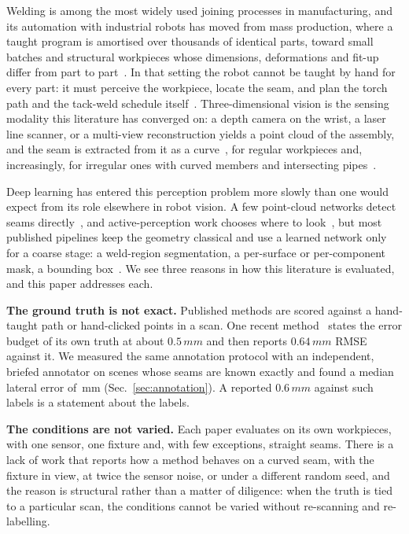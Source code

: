 \documentclass[letterpaper, 10 pt, conference]{ieeeconf}
\newcommand{\mm}{\,mm}
\begin{document}
Welding is among the most widely used joining processes in manufacturing, and its automation with industrial robots has moved from mass production, where a taught program is amortised over thousands of identical parts, toward small batches and structural workpieces whose dimensions, deformations and fit-up differ from part to part~\cite{yi2026seam,zhang2025lobb,fang2024model}. In that setting the robot cannot be taught by hand for every part: it must perceive the workpiece, locate the seam, and plan the torch path and the tack-weld schedule itself~\cite{zhou2020pathplanning,wang2025laser}. Three-dimensional vision is the sensing modality this literature has converged on: a depth camera on the wrist, a laser line scanner, or a multi-view reconstruction yields a point cloud of the assembly, and the seam is extracted from it as a curve~\cite{yi2026seam,wang2024ppf,zhang2025lobb,wang2026pipe,li2026impeller}, for regular workpieces and, increasingly, for irregular ones with curved members and intersecting pipes~\cite{zhang2025lobb,wang2026pipe,wang2023tubesheet}.

Deep learning has entered this perception problem more slowly than one would expect from its role elsewhere in robot vision. A few point-cloud networks detect seams directly~\cite{wang2024weldnet,song2025lwsnet,zhu2025sanet}, and active-perception work chooses where to look~\cite{tao2026paear}, but most published pipelines keep the geometry classical and use a learned network only for a coarse stage: a weld-region segmentation, a per-surface or per-component mask, a bounding box~\cite{yi2026seam,wei2024coarse,zhang2025lobb,wang2024ppf,wang2026pipe}. We see three reasons in how this literature is evaluated, and this paper addresses each.

\textbf{The ground truth is not exact.} Published methods are scored against a hand-taught path or hand-clicked points in a scan. One recent method~\cite{yi2026seam} states the error budget of its own truth at about $0.5\mm$ and then reports $0.64\mm$ RMSE against it. We measured the same annotation protocol with an independent, briefed annotator on scenes whose seams are known exactly and found a median lateral error of \annMedian\mm{} (Sec.~\ref{sec:annotation}). A reported $0.6\mm$ against such labels is a statement about the labels.

\textbf{The conditions are not varied.} Each paper evaluates on its own workpieces, with one sensor, one fixture and, with few exceptions, straight seams. There is a lack of work that reports how a method behaves on a curved seam, with the fixture in view, at twice the sensor noise, or under a different random seed, and the reason is structural rather than a matter of diligence: when the truth is tied to a particular scan, the conditions cannot be varied without re-scanning and re-labelling.
\end{document}
